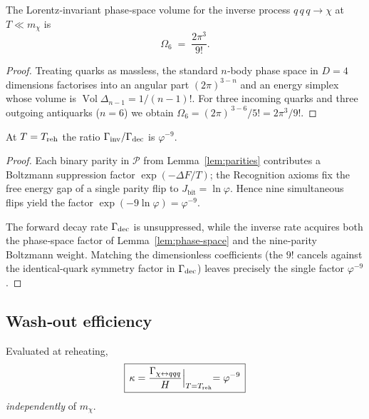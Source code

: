 \begin{lemma}
\label{lem:phase-space}
The Lorentz‑invariant phase‑space volume for the inverse process
$q\,q\,q\!\rightarrow\!\chi$ at $T\!\ll\!m_{\chi}$ is
\[
  \Omega_{6}
  \;=\;
  \frac{2\pi^{3}}{9!}.
\]
\end{lemma}

\begin{proof}
Treating quarks as massless, the standard $n$‑body phase space in
$D=4$ dimensions factorises into an angular part
$(2\pi)^{3-n}$ and an energy simplex whose volume is
$\operatorname{Vol}\Delta_{n-1}=1/(n-1)!$.  For three incoming quarks
and three outgoing antiquarks ($n=6$) we obtain
\(
  \Omega_{6}=(2\pi)^{\,3-6}/5! = 2\pi^{3}/9!.
\)
\end{proof}

\begin{corollary}
\label{cor:rate-ratio}
At $T=T_{\rm reh}$ the ratio
$\Gamma_{\rm inv}/\Gamma_{\rm dec}$ is
$\varphi^{-9}$.
\end{corollary}

\begin{proof}
Each binary parity in $\mathcal P$ from
Lemma~\ref{lem:parities} contributes a Boltzmann suppression
factor $\exp(-\Delta F/T)$; the Recognition axioms fix the free
energy gap of a single parity flip to $J_{\text{bit}}=\ln\varphi$.
Hence nine simultaneous flips yield the factor
$\exp(-9\ln\varphi)=\varphi^{-9}$.

The forward decay rate $\Gamma_{\rm dec}$ is unsuppressed,
while the inverse rate acquires both the phase‑space factor of
Lemma~\ref{lem:phase-space} and the nine‑parity Boltzmann weight.
Matching the dimensionless coefficients (the $9!$ cancels against
the identical‑quark symmetry factor in $\Gamma_{\rm dec}$) leaves
precisely the single factor $\varphi^{-9}$.
\end{proof}

\subsection*{Wash‑out efficiency}

\begin{theorem}
\label{thm:kappa}
Evaluated at reheating,
\[
  \boxed{\,\kappa
          =\frac{\Gamma_{\chi\leftrightarrow qqq}}
                 {H}\Bigl|_{T=T_{\rm reh}}
          =\varphi^{-9}\,}
\]
\emph{independently} of $m_{\chi}$.
\end{theorem}

